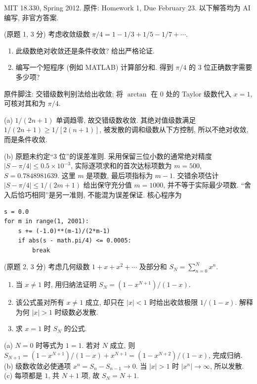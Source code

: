 \label{chapter-ps1}
MIT 18.330, Spring 2012. 原件: Homework 1, Due February 23. 以下解答均为 AI 编写, 非官方答案.

\begin{exercise}\label{ps1-q1}
(原题 1, 3 分) 考虑收敛级数
$\pi/4=1-1/3+1/5-1/7+\cdots$.
\begin{enumerate}[label=(\alph*)]
\item 此级数绝对收敛还是条件收敛? 给出严格论证.
\item 编写一个短程序 (例如 MATLAB) 计算部分和. 得到 $\pi/4$ 的 3 位正确数字需要多少项?
\end{enumerate}
原件脚注: 交错级数判别法给出收敛; 将 $\arctan$ 在 $0$ 处的 Taylor 级数代入 $x=1$, 可核对其和为 $\pi/4$.
\end{exercise}
\begin{solution}
(a) $1/(2n+1)$ 单调趋零, 故交错级数收敛. 其绝对值级数满足 $1/(2n+1)\ge 1/[2(n+1)]$, 被发散的调和级数从下方控制, 所以不绝对收敛, 而是条件收敛.

(b) 原题未约定“3 位”的误差准则. 采用保留三位小数的通常绝对精度 $|S-\pi/4|\le 0.5\times10^{-3}$, 实际逐项求和的首次达标项数为 $m=500$, $S=0.7848981639$. 这里 $m$ 是项数, 最后项指标为 $m-1$. 交错余项估计 $|S-\pi/4|\le1/(2m+1)$ 给出保守充分值 $m=1000$, 并不等于实际最少项数. “舍入后恰巧相同”是另一准则, 不能混为误差保证. 核心程序为
\begin{verbatim}
s = 0.0
for m in range(1, 2001):
    s += (-1.0)**(m-1)/(2*m-1)
    if abs(s - math.pi/4) <= 0.0005:
        break
\end{verbatim}
\end{solution}

\begin{exercise}\label{ps1-q2}
(原题 2, 3 分) 考虑几何级数 $1+x+x^2+\cdots$ 及部分和 $S_N=\sum_{n=0}^N x^n$.
\begin{enumerate}[label=(\alph*)]
\item 当 $x\ne1$ 时, 用归纳法证明 $S_N=(1-x^{N+1})/(1-x)$.
\item 该公式虽对所有 $x\ne1$ 成立, 却只在 $|x|<1$ 时给出收敛极限 $1/(1-x)$. 解释为何 $|x|>1$ 时级数必发散.
\item 求 $x=1$ 时 $S_N$ 的公式.
\end{enumerate}
\end{exercise}
\begin{solution}
(a) $N=0$ 时等式为 $1=1$. 若对 $N$ 成立, 则
$S_{N+1}=(1-x^{N+1})/(1-x)+x^{N+1}=(1-x^{N+2})/(1-x)$, 完成归纳.
(b) 级数收敛必使通项 $x^n=S_n-S_{n-1}\to0$. 当 $|x|>1$ 时 $|x^n|\to\infty$, 所以发散.
(c) 每项都是 $1$, 共 $N+1$ 项, 故 $S_N=N+1$.
\end{solution}

